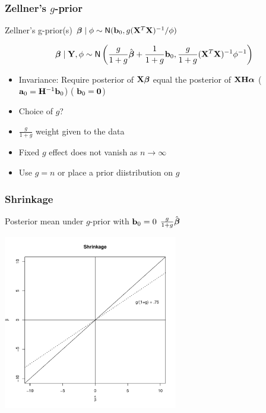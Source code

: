 \documentclass[handout]{beamer}
\begin{document}
\begin{frame}
  \frametitle{Zellner's $g$-prior}
Zellner's g-prior(s) $\boldsymbol{\beta} \mid \phi \sim \textsf{N}(\mathbf{b}_0, g
    (\mathbf{X}^T\mathbf{X})^{-1}/\phi)$ \pause

$$\boldsymbol{\beta} \mid \mathbf{Y}, \phi \sim \textsf{N}\left( \frac{g}{1 + g} \hat{\boldsymbol{\beta}} +  \frac{1}{1 + g}
\mathbf{b}_0, \frac{g}{1 + g} (\mathbf{X}^T\mathbf{X})^{-1} \phi^{-1} \right)$$ \pause

\begin{itemize}
\item Invariance: Require posterior of   $\mathbf{X} \boldsymbol{\beta}$  equal the posterior of $\mathbf{X} \mathbf{H} \boldsymbol{\alpha}$
\pause   ($\mathbf{a}_0 = \mathbf{H}^{-1} \mathbf{b}_0$)  (  $\mathbf{b}_0 = \mathbf{0}$)

\item Choice of $g$?  \pause
\item $\frac{g}{1 + g}$  weight given to the data \pause
\item Fixed $g$ effect does not vanish as $n \to \infty$
\item Use $g = n$ or place a prior diistribution on $g$
\end{itemize}


\end{frame}
\begin{frame}
  \frametitle{Shrinkage}
 Posterior mean under  $g$-prior  with $\mathbf{b}_0 = 0$
$\frac{g}{1 +g} \hat{\boldsymbol{\beta}} $

\centerline{\includegraphics[height=3in]{shrinkage}}
\end{frame}
\end{document}
